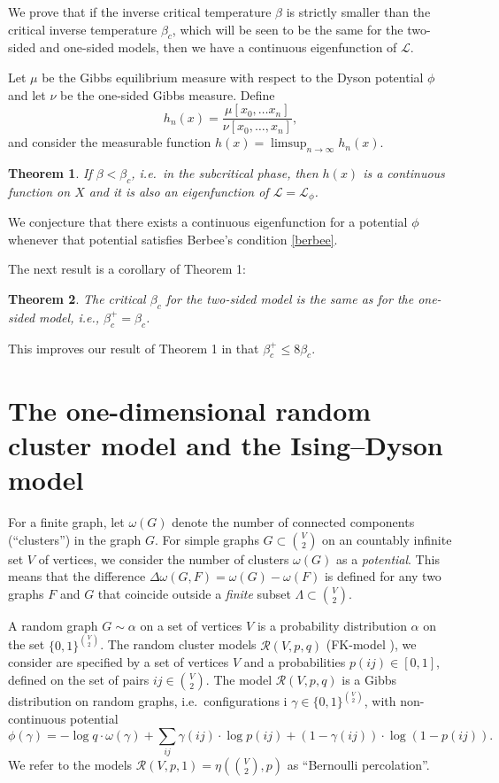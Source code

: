 \documentclass[11pt, a4paper]{amsart}
\newtheorem{thm}{Theorem}
\theoremstyle{definition}
\theoremstyle{remark}
\providecommand{\mscr}{\mathscr}
\providecommand{\mc}{\mathcal}
\providecommand{\w}{\omega}
\def\X{X}
\begin{document}
We prove that if the inverse critical temperature $\beta$ is strictly smaller than
the critical inverse temperature $\beta_c$, which will be seen to be the same for
the two-sided and one-sided models, then we have a continuous eigenfunction of
$\mc{L}$.

Let $\mu$ be the Gibbs equilibrium measure with respect
to the Dyson potential $\phi$ and let $\nu$ be the one-sided Gibbs measure.
Define
$$
h_n(x)=\frac{\mu[x_0,\ldots x_n]}{\nu[x_0,\ldots, x_n]},
$$
and consider the measurable function $h(x)=\limsup_{n\to \infty}h_n(x)$. 

\begin{thm}\label{main} 
  If $\beta<\beta_c$, i.e.\ in the subcritical phase, then $h(x)$ is a continuous
  function on $\X$ and it is also an eigenfunction of $\mc L = \mc{L}_\phi$.
\end{thm}

We conjecture that there exists a continuous eigenfunction for a potential
$\phi$ whenever that potential satisfies Berbee's condition \eqref{berbee}.

The next result is a corollary of Theorem 1:

\begin{thm}
The critical $\beta_c$ for the two-sided model 
is the same as for the one-sided model, i.e., 
$\beta_c^+=\beta_c$.
\end{thm}

This improves our result of Theorem 1 in \cite{johob4}
that $\beta_c^+\leq 8\beta_c$.

\section{The one-dimensional random cluster model and the Ising--Dyson model}

For a finite graph, let $\w(G)$ denote the number of connected components
(``clusters'') in the graph $G$. For simple graphs $G\subset \binom V2$ on an
countably infinite set $V$ of vertices, we consider the number of clusters
$\w(G)$ as a \emph{potential}. This means that the difference
$\Delta\w(G,F) = \w(G)-\w(F)$ is defined for any two graphs $F$ and $G$ that
coincide outside a \emph{finite} subset $\Lambda\subset \binom V2$.

A random graph $G\sim\alpha$ on a set of vertices $V$ is a probability
distribution $\alpha$ on the set $\{0,1\}^{\binom V2}$. The random cluster
models $\mscr R(V,p,q)$ (FK-model \cite{grimmet}), we consider are specified by a set 
of vertices $V$ and a probabilities $p(ij)\in[0,1]$, defined on the set of pairs
$ij\in \binom V2$. The model $\mscr R(V,p,q)$ is a Gibbs distribution on random
graphs, i.e.\ configurations i $\gamma\in\{0,1\}^{\binom V2}$, with 
non-continuous potential
$$
\phi(\gamma) = 
- \log q \cdot\w(\gamma) + 
\sum_{ij} \gamma(ij)\cdot \log p(ij) + (1-\gamma(ij))\cdot\log (1-p(ij)).
$$
We refer to the models $\mscr R(V,p,1)=\eta(\binom V2,p)$ as ``Bernoulli
percolation''.
\end{document}
